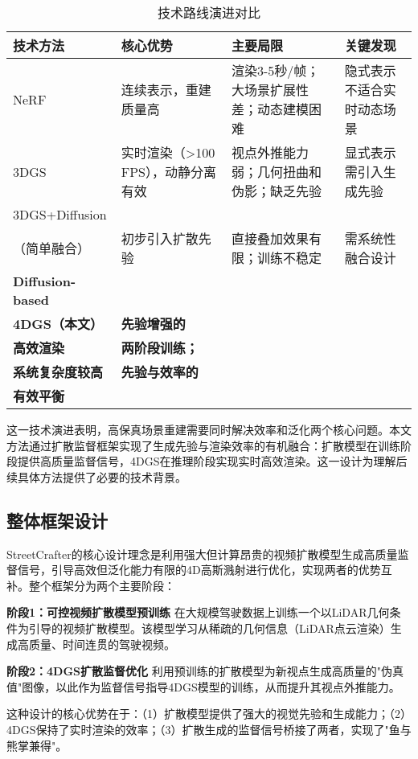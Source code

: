 \begin{table}[htbp]
\centering
\caption{技术路线演进对比}
\label{tab:technical-evolution}
\begin{tabular}{p{2.5cm}p{3.8cm}p{4.5cm}p{3cm}}
\toprule
\textbf{技术方法} & \textbf{核心优势} & \textbf{主要局限} & \textbf{关键发现} \\
\midrule
NeRF & 连续表示，重建质量高 & 渲染3-5秒/帧；大场景扩展性差；动态建模困难 & 隐式表示不适合实时动态场景 \\
\midrule
3DGS & 实时渲染（>100 FPS），动静分离有效 & 视点外推能力弱；几何扭曲和伪影；缺乏先验 & 显式表示需引入生成先验 \\
\midrule
3DGS+Diffusion\\（简单融合） & 初步引入扩散先验 & 直接叠加效果有限；训练不稳定 & 需系统性融合设计 \\
\midrule
\textbf{Diffusion-based}\\
\textbf{4DGS（本文）} & \textbf{先验增强的}\\
\textbf{高效渲染} & \textbf{两阶段训练；}\\
\textbf{系统复杂度较高} & \textbf{先验与效率的}\\
\textbf{有效平衡} \\
\bottomrule
\end{tabular}
\end{table}

这一技术演进表明，高保真场景重建需要同时解决效率和泛化两个核心问题。本文方法通过扩散监督框架实现了生成先验与渲染效率的有机融合：扩散模型在训练阶段提供高质量监督信号，4DGS在推理阶段实现实时高效渲染。这一设计为理解后续具体方法提供了必要的技术背景。

\subsection{整体框架设计}

StreetCrafter的核心设计理念是利用强大但计算昂贵的视频扩散模型生成高质量监督信号，引导高效但泛化能力有限的4D高斯溅射进行优化，实现两者的优势互补。整个框架分为两个主要阶段：

\textbf{阶段1：可控视频扩散模型预训练}
在大规模驾驶数据上训练一个以LiDAR几何条件为引导的视频扩散模型。该模型学习从稀疏的几何信息（LiDAR点云渲染）生成高质量、时间连贯的驾驶视频。

\textbf{阶段2：4DGS扩散监督优化}
利用预训练的扩散模型为新视点生成高质量的"伪真值"图像，以此作为监督信号指导4DGS模型的训练，从而提升其视点外推能力。

这种设计的核心优势在于：（1）扩散模型提供了强大的视觉先验和生成能力；（2）4DGS保持了实时渲染的效率；（3）扩散生成的监督信号桥接了两者，实现了"鱼与熊掌兼得"。

